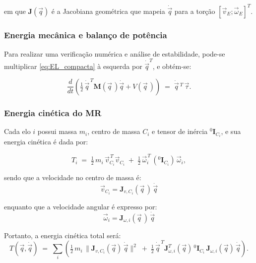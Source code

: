 em que $\mathbf J(\vec q)$ é a Jacobiana geométrica
que mapeia $\dot{\vec q}$ para a torção
$[\vec v_{E}; \vec \omega_{E}]^T$.

\subsubsection{Energia mecânica e balanço de potência}
Para realizar uma verificação numérica e análise de estabilidade, pode-se multiplicar
\eqref{eq:EL_compacta} à esquerda por
$\dot{\vec q}^T$, e obtém-se:

\begin{equation}
\frac{d}{dt}\!\left(
    \tfrac12\,\dot{\vec q}^{\,T}\mathbf M(\vec q\, )\dot{\vec q} + V(\vec q\, )\right)
\;=\;
\dot{\vec q}\, ^T\,\vec \tau.
\label{eq:energy_balance}
\end{equation}

\subsubsection{Energia cinética do MR}
\label{sec:MR_energia_cinetica}

Cada elo $i$ possui massa $m_i$, centro de massa $C_i$ e tensor de inércia ${}^{0}\!\mathbf I_{C_i}$, e sua energia cinética é dada por:

\begin{equation}
\label{eq:energia_elos}
T_i
\;=\;
\tfrac12\, m_i \,\vec v_{C_i}^{\,T}\vec v_{C_i}
\;+\; \tfrac12\, \vec \omega_i^{\,T}\, ({}^{0}\!\mathbf I_{C_i}) \, \vec \omega_i,
\end{equation}

sendo que a velocidade no centro de massa é:
\begin{equation}
\vec v_{C_i}
=
\mathbf J_{v,C_i}(\vec q\,)\,\dot{\vec q}
\end{equation}

enquanto que a velocidade angular é expresso por:
\begin{equation}
\vec \omega_i
=
\mathbf J_{\omega,i}(\vec q\, )\,\dot{\vec q}
\end{equation}

Portanto, a energia cinética total será:
\begin{equation}
\label{eq:T_soma_links}
T(\vec q,\dot{\vec q})
\;=\;
\sum_i \left(\tfrac12\, m_i\,\|\mathbf J_{v,C_i}(\vec q)\,\dot{\vec q}\|^2 \;+\; \tfrac12\, \dot{\vec q}^{\,T}\mathbf J_{\omega,i}^{T}(\vec q)\,{}^{0}\!\mathbf I_{C_i}\,\mathbf J_{\omega,i}(\vec q)\,\dot{\vec q}\right).
\end{equation}

